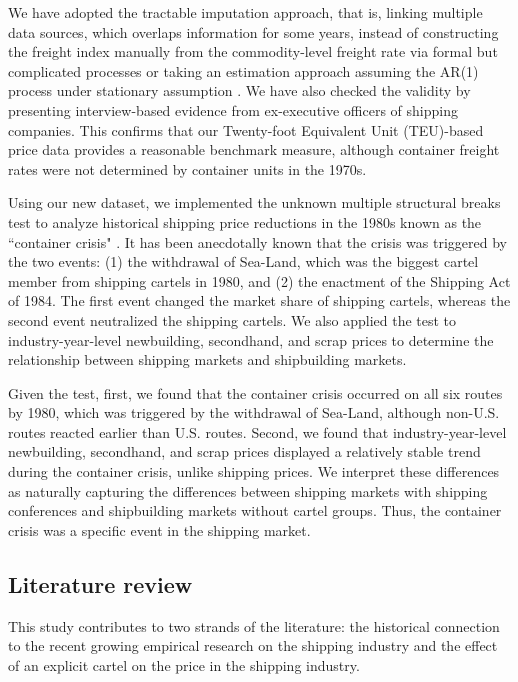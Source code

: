 \documentclass[11pt]{article}
\begin{document}
We have adopted the tractable imputation approach, that is, linking multiple data sources, which overlaps information for some years, instead of constructing the freight index manually from the commodity-level freight rate via formal but complicated processes or taking an estimation approach assuming the AR(1) process under stationary assumption \citep{jeon2022learning}. We have also checked the validity by presenting interview-based evidence from ex-executive officers of shipping companies. This confirms that our Twenty-foot Equivalent Unit (TEU)-based price data provides a reasonable benchmark measure, although container freight rates were not determined by container units in the 1970s.

Using our new dataset, we implemented the unknown multiple structural breaks test \citep{bai1998estimating,bai2003computation} to analyze historical shipping price reductions in the 1980s known as the ``container crisis" \citep{broeze2002globalisation}. It has been anecdotally known that the crisis was triggered by the two events: (1) the withdrawal of Sea-Land, which was the biggest cartel member from shipping cartels in 1980, and (2) the enactment of the Shipping Act of 1984. The first event changed the market share of shipping cartels, whereas the second event neutralized the shipping cartels. We also applied the test to industry-year-level newbuilding, secondhand, and scrap prices to determine the relationship between shipping markets and shipbuilding markets.

Given the test, first, we found that the container crisis occurred on all six routes by 1980, which was triggered by the withdrawal of Sea-Land, although non-U.S. routes reacted earlier than U.S. routes. Second, we found that industry-year-level newbuilding, secondhand, and scrap prices displayed a relatively stable trend during the container crisis, unlike shipping prices. We interpret these differences as naturally capturing the differences between shipping markets with shipping conferences and shipbuilding markets without cartel groups. Thus, the container crisis was a specific event in the shipping market.


\subsection{Literature review}\label{subsec:litereture}

This study contributes to two strands of the literature: the historical connection to the recent growing empirical research on the shipping industry and the effect of an explicit cartel on the price in the shipping industry.
\end{document}
